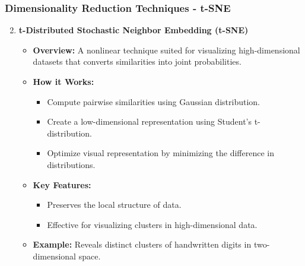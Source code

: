 \documentclass[aspectratio=169]{beamer}
\begin{document}
\begin{frame}[fragile]
    \frametitle{Dimensionality Reduction Techniques - t-SNE}
    \begin{enumerate}
        \setcounter{enumi}{1}
        \item \textbf{t-Distributed Stochastic Neighbor Embedding (t-SNE)}
        \begin{itemize}
            \item \textbf{Overview:} A nonlinear technique suited for visualizing high-dimensional datasets that converts similarities into joint probabilities.
            \item \textbf{How it Works:}
            \begin{itemize}
                \item Compute pairwise similarities using Gaussian distribution.
                \item Create a low-dimensional representation using Student's t-distribution.
                \item Optimize visual representation by minimizing the difference in distributions.
            \end{itemize}
            \item \textbf{Key Features:}
            \begin{itemize}
                \item Preserves the local structure of data.
                \item Effective for visualizing clusters in high-dimensional data.
            \end{itemize}
            \item \textbf{Example:} Reveals distinct clusters of handwritten digits in two-dimensional space.
        \end{itemize}
    \end{enumerate}
\end{frame}
\end{document}
